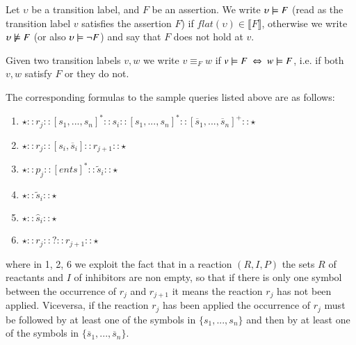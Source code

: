 \begin{definition}\label{sec:semantics}
Let  $\upsilon$ be  a transition label, and $F$ be an assertion.
We write $\upsilon \models F$ (read as the transition label $v$ satisfies the assertion $F$) 
if $\mathit{flat}(\upsilon)\in \llbracket F\rrbracket$, otherwise we write $\upsilon \not\models F$ (or also $\upsilon \models \neg F$) and say that $F$ does not hold at $v$. 
\end{definition}

Given two transition labels $v,w$ we write $v\equiv_F w$ if $v \models F\ \Leftrightarrow\ w \models F$, i.e. if both $v,w$ satisfy $F$ or they do not.


The corresponding formulas to the sample queries listed above are as follows:\\

\begin{enumerate}
\item
$\star :: r_j :: [ s_1,...,s_n ]^* :: s_i :: [  s_1,...,s_n ]^* :: [  \overline{s}_1,...,\overline{s}_n ]^+ :: \star$
\item
$\star :: r_j :: [s_i, \overline{s}_i] :: r_{j+1} :: \star$
\item
$\star :: p_j :: [  \mathit{ents} ]^* :: \tilde{s}_i :: \star$
\item
$\star :: \tilde{s}_i :: \star$
\item
$\star :: \hat{s}_i :: \star$
\item
$\star :: r_j :: ? :: r_{j+1} :: \star$
\end{enumerate}
where in 1, 2, 6 we exploit the fact that in a reaction $(R,I,P)$ the sets $R$ of reactants and  $I$ of inhibitors are non empty, so that if there is only one symbol between the occurrence of $r_j$ and $r_{j+1}$ it means the reaction $r_j$ has not been applied. Viceversa, if the reaction $r_j$ has been applied the occurrence of $r_j$ must be followed by at least one of the symbols in $\{s_1,...,s_n\}$ and then by at least one of the symbols in $\{\overline{s}_1,...,\overline{s}_n\}$.

